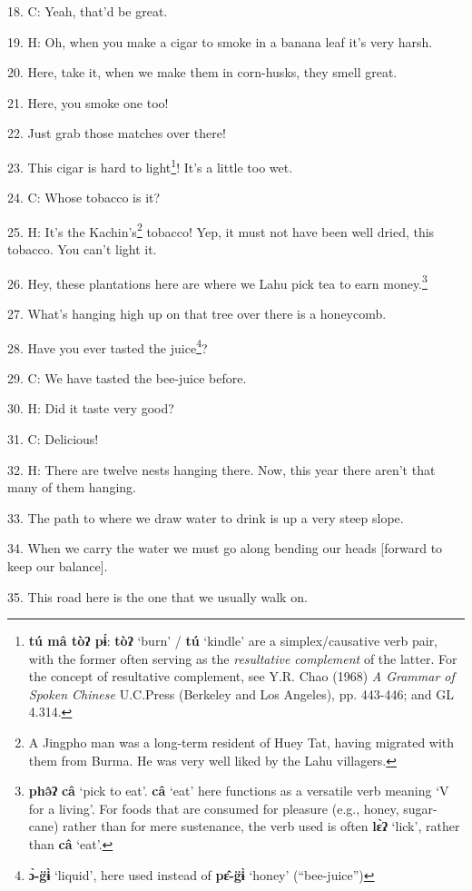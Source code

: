 18. C: Yeah, that'd be great.

19. H: Oh, when you make a cigar to smoke in a banana leaf it's very harsh.

20. Here, take it, when we make them in corn-husks, they smell great.

21. Here, you smoke one too!

22. Just grab those matches over there!

23. This cigar is hard to light\footnote{\textbf{tú mâ tòʔ pɨ́}: \textbf{tòʔ} `burn' / \textbf{tú} `kindle' are a simplex/causative verb pair, with the former often serving as the \textit{resultative complement} of the latter. For the concept of resultative complement, see Y.R. Chao (1968) \textit{A Grammar of Spoken Chinese }U.C.Press (Berkeley and Los Angeles), pp. 443-446; and GL 4.314.}! It's a little too wet.

24. C: Whose tobacco is it?

25. H: It's the Kachin's\footnote{A Jingpho man was a long-term resident of Huey Tat, having migrated with them from Burma. He was very well liked by the Lahu villagers.} tobacco! Yep, it must not have been well dried, this
tobacco. You can't light it.

26. Hey, these plantations here are where we Lahu pick tea to earn money.\footnote{\textbf{phə̂ʔ} \textbf{câ} `pick to eat'. \textbf{câ} `eat' here functions as a versatile verb meaning `V for a living'. For foods that are consumed for pleasure (e.g., honey, sugar-cane) rather than for mere sustenance, the verb used is often \textbf{lɛ̀ʔ} `lick', rather than \textbf{câ} `eat'.}

27. What's hanging high up on that tree over there is a honeycomb.

28. Have you ever tasted the juice\footnote{\textbf{ɔ̀-g̈ɨ̀} `liquid', here used instead of \textbf{pɛ̂-g̈ɨ̀} `honey' (``bee-juice'')}?

29. C: We have tasted the bee-juice before.

30. H: Did it taste very good?

31. C: Delicious!

32. H: There are twelve nests hanging there. Now, this year there aren't that many
of them hanging.

33. The path to where we draw water to drink is up a very steep slope.

34. When we carry the water we must go along bending our heads [forward to keep
our balance].

35. This road here is the one that we usually walk on.

